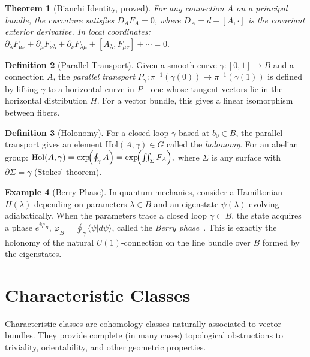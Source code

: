 \documentclass[12pt,a4paper]{amsart}
\newtheorem{theorem}{Theorem}[section]
\theoremstyle{definition}
\newtheorem{definition}[theorem]{Definition}
\newtheorem{example}[theorem]{Example}
\begin{document}
\begin{theorem}[Bianchi Identity, proved]
\label{thm:bianchi}
For any connection $A$ on a principal bundle, the curvature satisfies
$D_A F_A = 0$,
where $D_A = d + [A, \cdot]$ is the covariant exterior derivative. In local
coordinates:
$\partial_\lambda F_{\mu\nu} + \partial_\mu F_{\nu\lambda} + \partial_\nu F_{\lambda\mu}
+ [A_\lambda, F_{\mu\nu}] + \cdots = 0.$
\end{theorem}

\begin{definition}[Parallel Transport]
Given a smooth curve $\gamma \colon [0,1] \to B$ and a connection $A$, the
\emph{parallel transport} $P_\gamma \colon \pi^{-1}(\gamma(0)) \to
\pi^{-1}(\gamma(1))$ is defined by lifting $\gamma$ to a horizontal curve in
$P$---one whose tangent vectors lie in the horizontal distribution $H$.
For a vector bundle, this gives a linear isomorphism between fibers.
\end{definition}

\begin{definition}[Holonomy]
For a closed loop $\gamma$ based at $b_0 \in B$, the parallel transport
gives an element $\mathrm{Hol}(A, \gamma) \in G$ called the
\emph{holonomy}. For an abelian group:
$\mathrm{Hol}(A, \gamma) = \exp\!\Bigl(\oint_\gamma A\Bigr) = \exp\!\Bigl(\iint_\Sigma F_A\Bigr),$
where $\Sigma$ is any surface with $\partial\Sigma = \gamma$ (Stokes' theorem).
\end{definition}

\begin{example}[Berry Phase]
In quantum mechanics, consider a Hamiltonian $H(\lambda)$ depending on
parameters $\lambda \in B$ and an eigenstate $\psi(\lambda)$ evolving
adiabatically. When the parameters trace a closed loop $\gamma \subset B$,
the state acquires a phase
$e^{i\varphi_B}$, $\varphi_B = \oint_\gamma \langle \psi | d\psi \rangle$,
called the \emph{Berry phase}~\cite{berry1984}. This is exactly the holonomy of
the natural $U(1)$-connection on the line bundle over $B$ formed by the
eigenstates.
\end{example}

\section{Characteristic Classes}
\label{sec:characteristic}

Characteristic classes are cohomology classes naturally associated to vector
bundles. They provide complete (in many cases) topological obstructions to
triviality, orientability, and other geometric properties.
\end{document}

